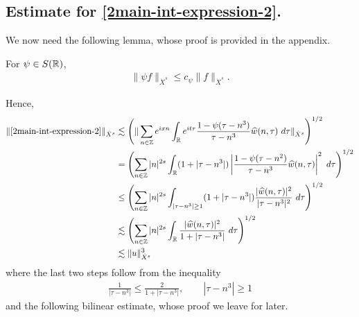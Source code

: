 \subsection{Estimate for \ref{2main-int-expression-2}.}
We now need the following lemma, whose proof is provided in the appendix.
%
%
%
%
%
%
%
%
\begin{lemma}
\label{2lem:schwartz-mult}
	For $\psi \in S(\mathbb{R})$,
%
%
\begin{equation}
	\label{2schwartz-mult}
	\begin{split}
		\|\psi f \|_{\dot{X}^s} \le c_{\psi} \|f \|_{\dot{X}^s}.
	\end{split}
\end{equation}
%
%
\end{lemma}
%
%
Hence,
%
%
\begin{equation}
	\label{2main-int2-est-X-s-part}
	\begin{split}
		\|\eqref{2main-int-expression-2}\|_{\dot{X}^s} 
		& \lesssim 
		\left( \| \sum_{n \in \zz} e^{ixn} \int_\rr 
		e^{it \tau} \frac{1 - \psi (\tau - n^{3} ) 
		}{\tau - n^{3}} \wh{w}(n, \tau) \ 
		d \tau\|_{\dot{X}^s} \right)^{1/2}
		\\
		& =  \left( \sum_{n \in \zz} |n|^{2s} \int_\rr
		(1 + |\tau - n^{3}|) \left | \frac{1 - \psi(\tau - n^{2 
		})}{\tau - n^{3}} 
		\wh{w}(n, \tau) \right |^2 \ d 
		\tau \right)^{1/2}
		\\
		& \le \left( \sum_{n \in \zz} |n|^{2s} \int_{| \tau - n^3| \ge 1}
		(1 + |\tau - n^{3}|) \frac{|\wh{w}(n, \tau)|^2 }{|\tau - n^3|^2} 
		\ d 
		\tau \right)^{1/2}
		\\
		& \lesssim  \left( \sum_{n \in 
		\zz} |n|^{2s} \int_\rr
		\frac{|\wh{w}(n, \tau) |^2}{1+ |\tau - 
		n^{3}|} 
		 \ d \tau 
		\right)^{1/2}
		\\
		& \lesssim  \|u\|_{\dot{X}^s}^3
	\end{split}
\end{equation}
%
%
where the last two steps follow from the inequality 
%
\begin{equation}
	\label{2one-plus-ineq}
	\begin{split}
		\frac{1}{|\tau - n^{3}| } \le \frac{2}{1 + |\tau - n^{3}| }, 
		\qquad |\tau - n^{3}| \ge 1
	\end{split}
\end{equation}
%
%
and the following bilinear estimate, whose proof we leave for later.
%
